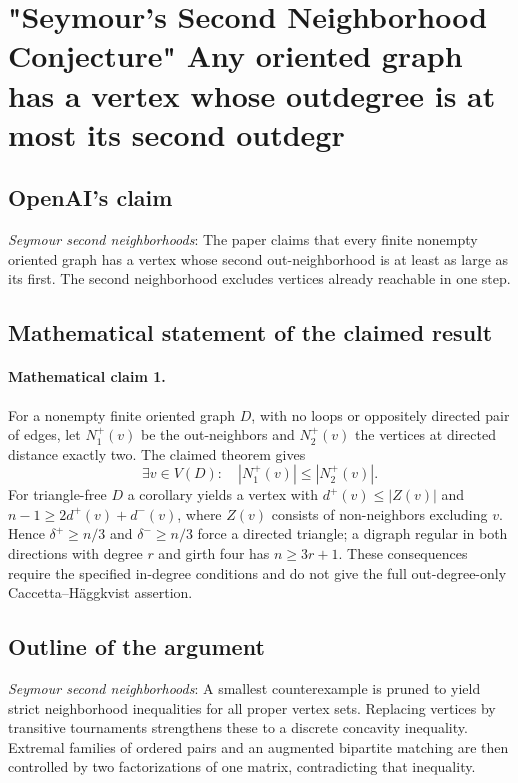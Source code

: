 \documentclass[11pt]{article}
\begin{document}
\section*{"Seymour's Second Neighborhood Conjecture" Any oriented graph has a vertex whose outdegree is at most its second outdegr}

\subsection{OpenAI's claim}
\textit{Seymour second neighborhoods}: The paper claims that every finite nonempty oriented graph has a vertex whose second out-neighborhood is at least as large as its first. The second neighborhood excludes vertices already reachable in one step.

\subsection{Mathematical statement of the claimed result}
\paragraph{Mathematical claim 1.} For a nonempty finite oriented graph $D$, with no loops or oppositely directed pair of edges, let $N_1^+(v)$ be the out-neighbors and $N_2^+(v)$ the vertices at directed distance exactly two. The claimed theorem gives \[\exists v\in V(D):\quad|N_1^+(v)|\le|N_2^+(v)|.\] For triangle-free $D$ a corollary yields a vertex with $d^+(v)\le|Z(v)|$ and $n-1\ge2d^+(v)+d^-(v)$, where $Z(v)$ consists of non-neighbors excluding $v$. Hence $\delta^+\ge n/3$ and $\delta^-\ge n/3$ force a directed triangle; a digraph regular in both directions with degree $r$ and girth four has $n\ge3r+1$. These consequences require the specified in-degree conditions and do not give the full out-degree-only Caccetta--H\"aggkvist assertion.

\subsection{Outline of the argument}
\textit{Seymour second neighborhoods}: A smallest counterexample is pruned to yield strict neighborhood inequalities for all proper vertex sets. Replacing vertices by transitive tournaments strengthens these to a discrete concavity inequality. Extremal families of ordered pairs and an augmented bipartite matching are then controlled by two factorizations of one matrix, contradicting that inequality.
\end{document}
